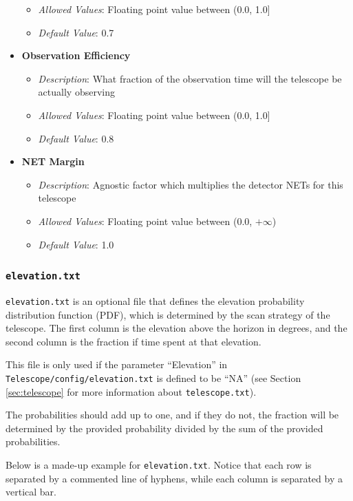 \documentclass[11pt]{article} %
\begin{document}
\begin{itemize}[noitemsep,topsep=0pt]
\begin{itemize}[noitemsep,topsep=0pt]
		\item \textit{Allowed Values}: Floating point value between (0.0, 1.0]
		\item \textit{Default Value}: 0.7
		\end{itemize}
	\item \textbf{Observation Efficiency}
		\begin{itemize}[noitemsep,topsep=0pt]
		\item \textit{Description}: What fraction of the observation time will the telescope be actually observing 
		\item \textit{Allowed Values}: Floating point value between (0.0, 1.0]
		\item \textit{Default Value}: 0.8
		\end{itemize}
	\item \textbf{NET Margin}
		\begin{itemize}[noitemsep,topsep=0pt]
		\item \textit{Description}: Agnostic factor which multiplies the detector NETs for this telescope 
		\item \textit{Allowed Values}: Floating point value between (0.0, $+\infty$)
		\item \textit{Default Value}: 1.0
		\end{itemize}
\end{itemize}


\subsubsection{\texttt{elevation.txt}}
\label{sec:telelv}

\texttt{elevation.txt} is an optional file that defines the elevation probability distribution function (PDF), which is determined by the scan strategy of the telescope. The first column is the elevation above the horizon in degrees, and the second column is the fraction if time spent at that elevation. 

This file is only used if the parameter ``Elevation'' in \texttt{Telescope/config/elevation.txt} is defined to be ``NA'' (see Section \ref{sec:telescope} for more information about \texttt{telescope.txt}).

The probabilities should add up to one, and if they do not, the fraction will be determined by the provided probability divided by the sum of the provided probabilities.

Below is a made-up example for \texttt{elevation.txt}. Notice that each row is separated by a commented line of hyphens, while each column is separated by a vertical bar.
\end{document}
